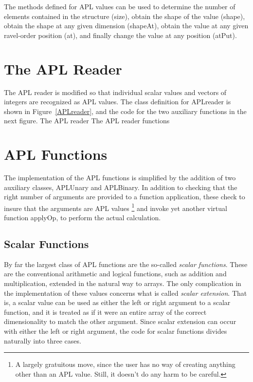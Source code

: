 The methods defined for APL values can be used to determine the number of
elements contained in the structure ({\sf size}), obtain the shape of the value
({\sf shape}), obtain the shape at any given dimension ({\sf shapeAt}), obtain
the value at any given ravel-order position ({\sf at}), and finally change the
value at any position ({\sf atPut}).

\section{The APL Reader}

The APL reader is modified so that individual scalar values and vectors of
integers are recognized as APL values.  The class definition for {\sf APLreader}
is shown in Figure~\ref{APLreader}, and the code for the two auxiliary functions
in the next figure.
%
{The APL reader}
%
{The APL reader functions}

\section{APL Functions}

The implementation of the APL functions is simplified by the addition of two
auxiliary classes, {\sf APLUnary} and {\sf APLBinary}.  In addition to checking
that the right number of arguments are provided to a function application, these
check to insure that the arguments are APL values \footnote{A largely gratuitous
    move, since the user has no way of creating anything other than an APL
    value.  Still, it doesn't do any harm to be careful.} and invoke yet another
virtual function {\sf applyOp}, to perform the actual calculation.

\subsection{Scalar Functions}

By far the largest class of APL functions are the so-called {\em scalar
    functions}.  These are the conventional arithmetic and logical functions,
such as addition and multiplication, extended in the natural way to arrays.  The
only complication in the implementation of these values concerns what is called
{\em scalar extension}.  That is, a scalar value can be used as either the left
or right argument to a scalar function, and it is treated as if it were an
entire array of the correct dimensionality to match the other argument.  Since
scalar extension can occur with either the left or right argument, the code for
scalar functions divides naturally into three cases.

